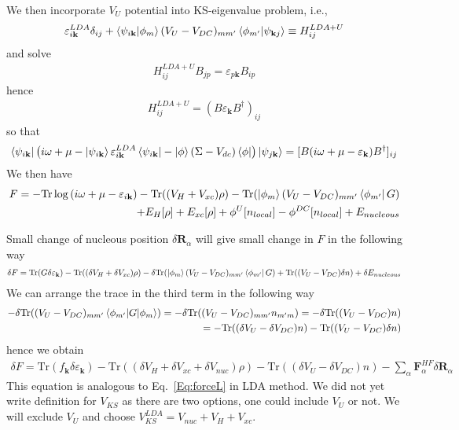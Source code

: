 \documentclass[aps,prb,floatfix,epsfig,singlecolumn,showpacs,preprintnumbers]{revtex4}
\newcommand{\vR}{{\mathbf{R}}}
\newcommand{\vF}{{\mathbf{F}}}
\newcommand{\vk}{{\mathbf{k}}}
\newcommand{\Tr}{\mathrm{Tr}}
\begin{document}
We then incorporate $V_U$ potential into KS-eigenvalue problem, i.e.,
\begin{eqnarray}
\varepsilon_{i\vk}^{LDA}\delta_{ij}+\braket{\psi_{i\vk}|\phi_m}(V_U-V_{DC})_{mm'}
  \braket{\phi_{m'}|\psi_{\vk j}}\equiv H_{ij}^{LDA+U}
\end{eqnarray}
and solve
\begin{eqnarray}
H_{ij}^{LDA+U} B_{jp}=\varepsilon_{p\vk} B_{ip}
\end{eqnarray}
hence
\begin{eqnarray}
H_{ij}^{LDA+U} = (B \varepsilon_\vk B^\dagger)_{ij}
\end{eqnarray}
so that
\begin{eqnarray}
\braket{\psi_{i\vk}|\left( i\omega+\mu-\ket{\psi_{i\vk}}\varepsilon^{LDA}_{i\vk}\bra{\psi_{i\vk}}-\ket{\phi}(\Sigma-V_{dc})\bra{\phi} \right)|\psi_{j\vk}}
=[B(i\omega+\mu-\varepsilon_\vk)B^\dagger]_{ij}
\end{eqnarray}
We then have
\begin{eqnarray}
F = -\Tr\log\left( i\omega+\mu-\varepsilon_{i\vk} \right) - \Tr((V_H+V_{xc})\rho) 
- \Tr( \ket{\phi_m}(V_U-V_{DC})_{mm'}\bra{\phi_{m'}} G)\nonumber\\
+ E_{H}[\rho]+E_{xc}[\rho] 
+ \phi^{U}[n_{local}]-\phi^{DC}[n_{local}] 
+ E_{nucleous}
\label{LDAU:func}
\end{eqnarray}

Small change of nucleous position $\delta \vR_\alpha$ will give small
change in $F$ in the following way
\begin{eqnarray}
\delta F = \Tr(G\delta\varepsilon_{\vk}) - \Tr((\delta V_H+\delta V_{xc})\rho)
-\delta \Tr( \ket{\phi_m}(V_U-V_{DC})_{mm'}\bra{\phi_{m'}} G)
+\Tr((V_U-V_{DC})\delta n)+\delta E_{nucleous}
\end{eqnarray}
We can arrange the trace in the third term in the following way
\begin{eqnarray}
-\delta \Tr( (V_U-V_{DC})_{mm'}\braket{\phi_{m'}| G|\phi_m})=
-\delta \Tr( (V_U-V_{DC})_{mm'} n_{m'm})=-\delta \Tr( (V_U-V_{DC}) n)\\
=-\Tr( (\delta V_U-\delta V_{DC}) n)-\Tr( (V_U-V_{DC}) \delta n)
\end{eqnarray}
hence we obtain
\begin{eqnarray}
\delta F = \Tr(f_\vk \delta\varepsilon_{\vk}) - 
\Tr((\delta V_H+\delta  V_{xc}+\delta V_{nuc})\rho)-\Tr((\delta V_U-\delta V_{DC}) n)
-\sum_\alpha\vF^{HF}_\alpha\delta \vR_\alpha
\end{eqnarray}
This equation is analogous to Eq.~\ref{Eq:forceL} in LDA method.
We did not yet write definition for $V_{KS}$ as there are two options,
one could include $V_U$ or not. We will exclude $V_U$ and choose $V_{KS}^{LDA}=V_{nuc}+V_{H}+V_{xc}$.
\end{document}
